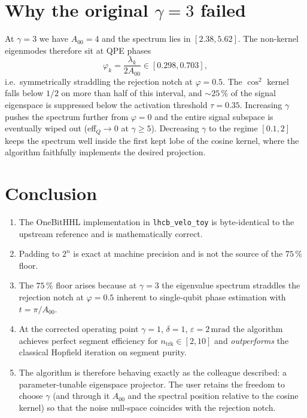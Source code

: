 \documentclass[a4paper,11pt]{article}
\newcommand{\SI}[2]{#1\,#2}
\newcommand{\milli}{\mathrm{m}}
\newcommand{\radian}{\mathrm{rad}}
\begin{document}
\section{Why the original $\gamma{=}3$ failed}
At $\gamma{=}3$ we have $A_{00} = 4$ and the spectrum lies in $[2.38, 5.62]$. The non-kernel
eigenmodes therefore sit at QPE phases
\[
\varphi_k = \frac{\lambda_k}{2 A_{00}} \in [0.298, 0.703],
\]
i.e.\ symmetrically straddling the rejection notch at $\varphi = 0.5$. The $\cos^2$ kernel
falls below $1/2$ on more than half of this interval, and ${\sim}25\,\%$ of the
signal eigenspace is suppressed below the activation threshold $\tau = 0.35$. Increasing
$\gamma$ pushes the spectrum further from $\varphi = 0$ and the entire signal subspace is
eventually wiped out (eff$_Q \to 0$ at $\gamma \ge 5$). Decreasing $\gamma$ to the regime
$[0.1, 2]$ keeps the spectrum well inside the first kept lobe of the cosine kernel, where
the algorithm faithfully implements the desired projection.

\section{Conclusion}
\begin{enumerate}
  \item The OneBitHHL implementation in \texttt{lhcb\_velo\_toy} is byte-identical to the
        upstream reference and is mathematically correct.
  \item Padding to $2^n$ is exact at machine precision and is not the source of the
        $75\,\%$ floor.
  \item The $75\,\%$ floor arises because at $\gamma{=}3$ the eigenvalue spectrum
        straddles the rejection notch at $\varphi = 0.5$ inherent to single-qubit phase
        estimation with $t = \pi / A_{00}$.
  \item At the corrected operating point $\gamma{=}1$, $\delta{=}1$,
        $\varepsilon{=}\SI{2}{\milli\radian}$ the algorithm achieves perfect segment
        efficiency for $n_\mathrm{trk} \in [2, 10]$ and \emph{outperforms} the classical
        Hopfield iteration on segment purity.
  \item The algorithm is therefore behaving exactly as the colleague described:
        a parameter-tunable eigenspace projector. The user retains the freedom to choose
        $\gamma$ (and through it $A_{00}$ and the spectral position relative to the
        cosine kernel) so that the noise null-space coincides with the rejection notch.
\end{enumerate}
\end{document}
